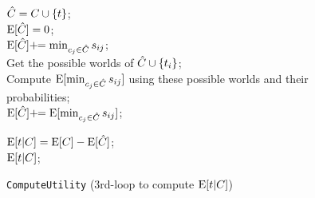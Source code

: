 
 \begin{figure}[!t]
 \vspace{-1em}
	\begin{algorithm}[H]
		\normalem
	\caption{\texttt{ComputeUtility} (3rd-loop to compute $\mathrm{E}[t|C]$) \label{alg:one}}
		{\small
		    $\hat{C} = C \cup \{t\}$;\\
		    $\mathrm{E}[\hat{C}] = 0$; \\
			{    
                {
                   $\mathrm{E}[\hat{C}] +\!\!= \min_{c_j\in \hat{C}}s_{ij}$;\\
                }
                \Else 
                {
                	Get the possible worlds of $\hat{C} \cup \{t_i\}$;\\
                	Compute $\mathrm{E}[\min_{c_j\in \hat{C}}s_{ij}]$ using these possible worlds and their probabilities;\\
                	$\mathrm{E}[\hat{C}] +\!\!= \mathrm{E}[\min_{c_j\in \hat{C}}s_{ij}]$;\\
                } 
			}	
		
	 	$\mathrm{E}[t|C] = \mathrm{E}[C] - \mathrm{E}[\hat{C}]$;\\
		\Return $\mathrm{E}[t|C]$;\\
		}
	\end{algorithm}
\end{figure}